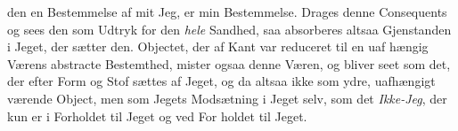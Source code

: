 \documentclass[12pt,a4paper]{book}
\begin{document}
den en Bestemmelse af mit Jeg, er min Bestemmelse.
Drages denne Consequents og sees den som Udtryk for den
\emph{hele} Sandhed, saa absorberes altsaa Gjenstanden i Jeget, der
sætter den. Objectet, der af Kant var reduceret til en uaf\-%
hængig Værens abstracte Bestemthed, mister ogsaa denne
Væren, og bliver seet som det, der efter Form og Stof sættes
af Jeget, og da altsaa ikke som ydre, uafhængigt værende
Object, men som Jegets Modsætning i Jeget selv, som det
\emph{Ikke-Jeg}, der kun er i Forholdet til Jeget og ved For\-%
holdet til Jeget.
\end{document}

